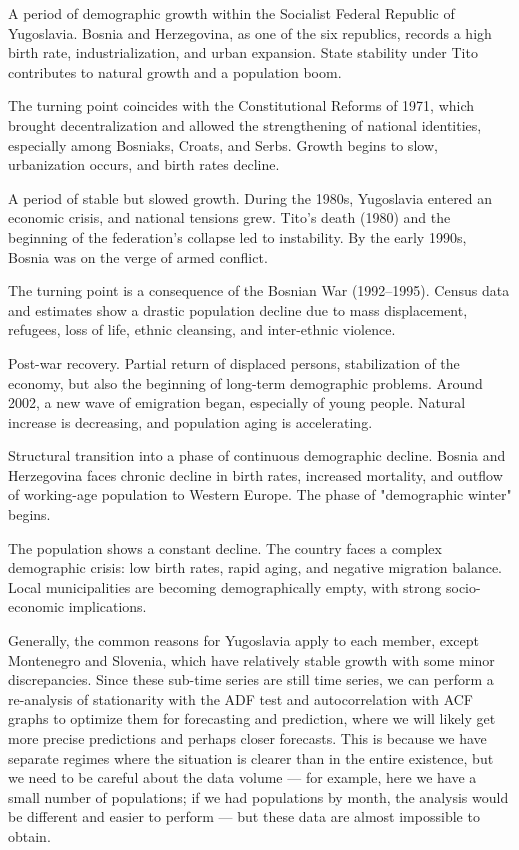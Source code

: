 \documentclass[a4paper,11pt]{article}
\begin{document}
\begin{description}[labelsep=1em, leftmargin=2.5em]
\item[1961–1971:] 
A period of demographic growth within the Socialist Federal Republic of Yugoslavia. Bosnia and Herzegovina, as one of the six republics, records a high birth rate, industrialization, and urban expansion. State stability under Tito contributes to natural growth and a population boom.
\item[Turning point ~1971:] 
The turning point coincides with the Constitutional Reforms of 1971, which brought decentralization and allowed the strengthening of national identities, especially among Bosniaks, Croats, and Serbs. Growth begins to slow, urbanization occurs, and birth rates decline.
\item[1971–1993:] 
A period of stable but slowed growth. During the 1980s, Yugoslavia entered an economic crisis, and national tensions grew. Tito's death (1980) and the beginning of the federation's collapse led to instability. By the early 1990s, Bosnia was on the verge of armed conflict.
\item[Turning point ~1993:] 
The turning point is a consequence of the Bosnian War (1992–1995). Census data and estimates show a drastic population decline due to mass displacement, refugees, loss of life, ethnic cleansing, and inter-ethnic violence.
\item[1993–2012:] 
Post-war recovery. Partial return of displaced persons, stabilization of the economy, but also the beginning of long-term demographic problems. Around 2002, a new wave of emigration began, especially of young people. Natural increase is decreasing, and population aging is accelerating.
\item[Turning point ~2012:] 
Structural transition into a phase of continuous demographic decline. Bosnia and Herzegovina faces chronic decline in birth rates, increased mortality, and outflow of working-age population to Western Europe. The phase of "demographic winter" begins.
\item[2012–2022:] 
The population shows a constant decline. The country faces a complex demographic crisis: low birth rates, rapid aging, and negative migration balance. Local municipalities are becoming demographically empty, with strong socio-economic implications.
\end{description}
Generally, the common reasons for Yugoslavia apply to each member, except Montenegro and Slovenia, which have relatively stable growth with some minor discrepancies.
Since these sub-time series are still time series, we can perform a re-analysis of stationarity with the ADF test and autocorrelation with ACF graphs to optimize them for forecasting and prediction, where we will likely get more precise predictions and perhaps closer forecasts. This is because we have separate regimes where the situation is clearer than in the entire existence, but we need to be careful about the data volume — for example, here we have a small number of populations; if we had populations by month, the analysis would be different and easier to perform — but these data are almost impossible to obtain.
\end{document}
